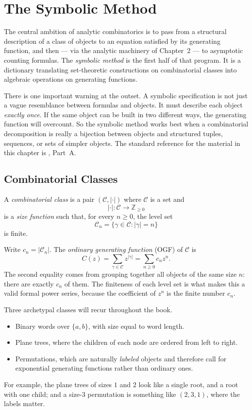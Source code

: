 \chapter{The Symbolic Method}

The central ambition of analytic combinatorics is to pass from a structural description of a class of objects to an equation satisfied by its generating function, and then --- via the analytic machinery of Chapter~2 --- to asymptotic counting formulas. The \emph{symbolic method} is the first half of that program. It is a dictionary translating set-theoretic constructions on combinatorial classes into algebraic operations on generating functions.

There is one important warning at the outset. A symbolic specification is not just a vague resemblance between formulas and objects. It must describe each object \emph{exactly once}. If the same object can be built in two different ways, the generating function will overcount. So the symbolic method works best when a combinatorial decomposition is really a bijection between objects and structured tuples, sequences, or sets of simpler objects. The standard reference for the material in this chapter is \cite{FlajoletSedgewick2009}, Part~A.

\section{Combinatorial Classes}

\begin{definition}
A \emph{combinatorial class} is a pair $(\mathcal{C}, |\cdot|)$ where $\mathcal{C}$ is a set and
\[
  |\cdot| : \mathcal{C} \to \mathbb{Z}_{\ge 0}
\]
is a \emph{size function} such that, for every $n \ge 0$, the level set
\[
  \mathcal{C}_n = \{\gamma \in \mathcal{C} : |\gamma| = n\}
\]
is finite.
\end{definition}

Write $c_n = |\mathcal{C}_n|$. The \emph{ordinary generating function} (OGF) of $\mathcal{C}$ is
\[
  C(z) = \sum_{\gamma \in \mathcal{C}} z^{|\gamma|} = \sum_{n \ge 0} c_n z^n.
\]
The second equality comes from grouping together all objects of the same size $n$: there are exactly $c_n$ of them. The finiteness of each level set is what makes this a valid formal power series, because the coefficient of $z^n$ is the finite number $c_n$.

Three archetypal classes will recur throughout the book.
\begin{itemize}
  \item Binary words over $\{a,b\}$, with size equal to word length.
  \item Plane trees, where the children of each node are ordered from left to right.
  \item Permutations, which are naturally \emph{labeled} objects and therefore call for exponential generating functions rather than ordinary ones.
\end{itemize}
For example, the plane trees of sizes $1$ and $2$ look like a single root, and a root with one child; and a size-$3$ permutation is something like $(2,3,1)$, where the labels matter.

